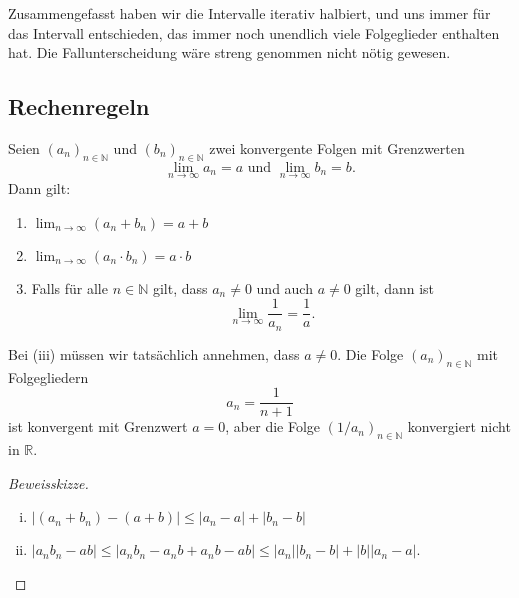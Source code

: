 \documentclass[../main.tex]{subfiles}
\begin{document}
Zusammengefasst haben wir die Intervalle
iterativ halbiert, und uns immer für das Intervall
entschieden, das immer noch unendlich viele
Folgeglieder enthalten hat.
Die Fallunterscheidung wäre streng genommen nicht
nötig gewesen.

\subsection*{Rechenregeln}
\begin{proposition}
  Seien ${(a_n)}_{n \in \mathbb{N}}$ und
  ${(b_n)}_{n \in \mathbb{N}}$ zwei
  konvergente Folgen mit Grenzwerten
  \[
    \lim_{n \to \infty} a_n = a \text{ und }
    \lim_{n \to \infty} b_n = b.
  \]
  Dann gilt:
  \begin{enumerate}[\normalfont(i)]
    \item $\lim_{n \to \infty} (a_n + b_n) = a + b$ 
    \item $\lim_{n \to \infty} (a_n \cdot b_n) = a \cdot b$
    \item Falls für alle $n \in \mathbb{N}$ gilt,
      dass $a_n \neq 0$ und auch $a \neq 0$ gilt,
      dann ist
      \[
        \lim_{n \to \infty} \frac{1}{a_n} = \frac{1}{a}.
      \]
  \end{enumerate}
\end{proposition}

\begin{remark}
Bei (iii) müssen wir tatsächlich annehmen,
dass $a \neq 0$. Die Folge ${(a_n)}_{n \in \mathbb{N}}$ 
mit Folgegliedern
\[
  a_n = \frac{1}{n+1}
\]
ist konvergent mit Grenzwert $a = 0$, aber die Folge
${(1/a_n)}_{n \in \mathbb{N}}$ konvergiert nicht in $\mathbb{R}$.
\end{remark}

\begin{proof}[Beweisskizze]
  \leavevmode
  \begin{enumerate}[(i)]
    \item $|(a_n + b_n) - (a + b)| \leq |a_n - a| + |b_n - b|$
    \item $|a_nb_n - ab| \leq |a_nb_n - a_n b + a_n b - ab |
      \leq |a_n| |b_n - b| + |b||a_n -a|$. \qedhere
  \end{enumerate}
\end{proof}
\end{document}
